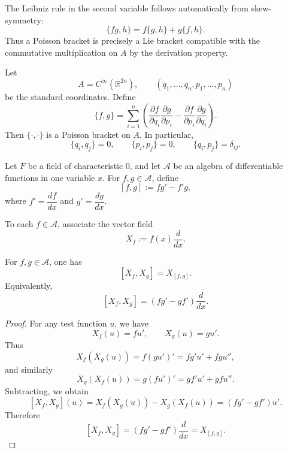 \documentclass[11pt, a4paper]{report}
\begin{document}
    \begin{remark}
    The Leibniz rule in the second variable follows automatically from skew-symmetry:
    \[
    \{fg,h\}=f\{g,h\}+g\{f,h\}.
    \]
    Thus a Poisson bracket is precisely a Lie bracket compatible with the
    commutative multiplication on $A$ by the derivation property.
    \end{remark}
    
    \begin{example}
    Let
    \[
    A=C^\infty(\mathbb{R}^{2n}),
    \qquad
    (q_1,\dots,q_n,p_1,\dots,p_n)
    \]
    be the standard coordinates. Define
    \[
    \{f,g\}
    =
    \sum_{i=1}^n
    \left(
    \frac{\partial f}{\partial q_i}\frac{\partial g}{\partial p_i}
    -
    \frac{\partial f}{\partial p_i}\frac{\partial g}{\partial q_i}
    \right).
    \]
    Then $\{\cdot,\cdot\}$ is a Poisson bracket on $A$.
    In particular,
    \[
    \{q_i,q_j\}=0,\qquad
    \{p_i,p_j\}=0,\qquad
    \{q_i,p_j\}=\delta_{ij}.
    \]
    \end{example}
    
    \begin{definition}
        Let $F$ be a field of characteristic $0$, and let $\mathcal{A}$ be an algebra of differentiable functions in one variable $x$.
        For $f,g\in \mathcal{A}$, define
        \[
        [f,g]:=fg'-f'g,
        \]
        where $f'=\dfrac{df}{dx}$ and $g'=\dfrac{dg}{dx}$.
        \end{definition}
        
        \begin{definition}
        To each $f\in \mathcal{A}$, associate the vector field
        \[
        X_f:=f(x)\frac{d}{dx}.
        \]
        \end{definition}
        
        \begin{proposition}
        For $f,g\in \mathcal{A}$, one has
        \[
        [X_f,X_g]=X_{[f,g]}.
        \]
        Equivalently,
        \[
        [X_f,X_g]=\left(fg'-gf'\right)\frac{d}{dx}.
        \]
        \end{proposition}
        
        \begin{proof}
        For any test function $u$, we have
        \[
        X_f(u)=fu', \qquad X_g(u)=gu'.
        \]
        Thus
        \[
        X_f(X_g(u))=f(gu')'=fg'u'+fgu'',
        \]
        and similarly
        \[
        X_g(X_f(u))=g(fu')'=gf'u'+gfu''.
        \]
        Subtracting, we obtain
        \[
        [X_f,X_g](u)=X_f(X_g(u))-X_g(X_f(u))=(fg'-gf')u'.
        \]
        Therefore
        \[
        [X_f,X_g]=\left(fg'-gf'\right)\frac{d}{dx}=X_{[f,g]}.
        \]
        \end{proof}
        
\end{document}

